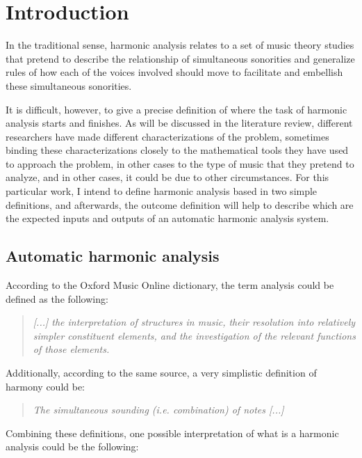 \chapter{Introduction}
In the traditional sense, harmonic analysis relates to a set of music theory studies that pretend to describe the relationship of simultaneous sonorities and generalize rules of how each of the voices involved should move to facilitate and embellish these simultaneous sonorities.

It is difficult, however, to give a precise definition of where the task of harmonic analysis starts and finishes. As will be discussed in the literature review, different researchers have made different characterizations of the problem, sometimes binding these characterizations closely to the mathematical tools they have used to approach the problem, in other cases to the type of music that they pretend to analyze, and in other cases, it could be due to other circumstances. For this particular work, I intend to define harmonic analysis based in two simple definitions, and afterwards, the outcome definition will help to describe which are the expected inputs and outputs of an automatic harmonic analysis system.

\section{Automatic harmonic analysis}
According to the Oxford Music Online dictionary, the term analysis could be defined as the following: \cite{oxfordanalysis}

\begin{quote}
\centering
\emph{[...] the interpretation of structures in music, \linebreak
their resolution into relatively simpler constituent elements, \linebreak and the investigation of the relevant functions of those elements.}
\end{quote}

Additionally, according to the same source, a very simplistic definition of harmony could be: \cite{oxfordharmony}

\begin{quote}
\centering
\emph{The simultaneous sounding (i.e. combination) of notes [...]}
\end{quote}

Combining these definitions, one possible interpretation of what is a harmonic analysis could be the following:

